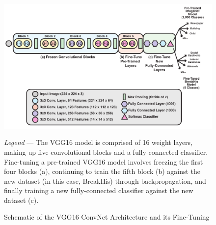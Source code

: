 \begin{figure}[h]
	\begin{center}
		\caption{Schematic of the VGG16 ConvNet Architecture and its Fine-Tuning \label{fig:vgg_arch}}
	\end{center}
	\includegraphics[width=160mm]{figures/deepduct/vgg_overview.pdf}
	\begin{singlespace}
		\textit{Legend} --- The VGG16 model is comprised of 16 weight layers, making up five convolutional blocks and a fully-connected classifier. Fine-tuning a pre-trained VGG16 model involves freezing the first four blocks (a), continuing to train the fifth block (b) against the new dataset (in this case, BreakHis) through backpropagation, and finally training a new fully-connected classifier against the new dataset (c).
	\end{singlespace}
	
\end{figure}